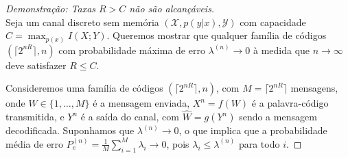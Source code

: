 \begin{proof}[Demonstração: Taxas $R > C$ não são alcançáveis] \ \\

Seja um canal discreto sem memória $(\mathcal{X}, p(y|x), \mathcal{Y})$ com capacidade 
$C = \max_{p(x)} I(X;Y)$. Queremos mostrar que qualquer família de códigos 
$(\lceil 2^{nR} \rceil, n)$ com probabilidade máxima de erro $\lambda^{(n)} \to 0$ à
medida que $n \to \infty$ deve satisfazer $R \leq C$.

Consideremos uma família de códigos $(\lceil 2^{nR} \rceil, n)$, com 
$M = \lceil 2^{nR} \rceil$ mensagens, onde $W \in \{1, \ldots, M\}$ é a mensagem
enviada, $X^n = f(W)$ é a palavra-código transmitida, e $Y^n$ é a saída do
canal, com $\hat{W} = g(Y^n)$ sendo a mensagem decodificada. Suponhamos que
$\lambda^{(n)} \to 0$, o que implica que a probabilidade média de erro
$P_e^{(n)} = \frac{1}{M} \sum_{i=1}^M \lambda_i \to 0$, pois 
$\lambda_i \leq \lambda^{(n)}$ para todo $i$.


\end{proof}
